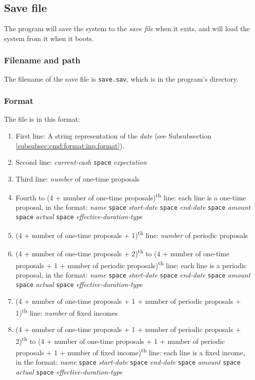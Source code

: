 \subsection{Save file}
The program will save the system to the \emph{save file} when it exits, and will load the system from it when it boots.

\subsubsection{Filename and path}
The filename of the save file is \texttt{save.sav}, which is in the program's directory.

\subsubsection{Format}
The file is in this format:
\begin{enumerate}
	\item First line: A string representation of the \emph{date} (see Subsubsection \ref{subsubsec:cmd:format:inp.format}).
	\item Second line: \emph{current-cash} \texttt{space} \emph{expectation}
	\item Third line: \emph{number} of one-time proposals
	\item Fourth to (4 + number of one-time proposals)\textsuperscript{th} line: each line is a one-time proposal, in the format: \emph{name} \texttt{space} \emph{start-date} \texttt{space} \emph{end-date} \texttt{space} \emph{amount} \texttt{space} \emph{actual} \texttt{space} \emph{effective-duration-type} 
	\item (4 + number of one-time proposals + 1)\textsuperscript{th} line: \emph{number} of periodic proposals
	\item (4 + number of one-time proposals + 2)\textsuperscript{th} to (4 + number of one-time proposals + 1 + number of periodic proposals)\textsuperscript{th} line: each line is a periodic proposal, in the format: \emph{name} \texttt{space} \emph{start-date} \texttt{space} \emph{end-date} \texttt{space} \emph{amount} \texttt{space} \emph{actual} \texttt{space} \emph{effective-duration-type} 
	\item (4 + number of one-time proposals + 1 + number of periodic proposals + 1)\textsuperscript{th} line: \emph{number} of fixed incomes
	\item (4 + number of one-time proposals + 1 + number of periodic proposals + 2)\textsuperscript{th} to (4 + number of one-time proposals + 1 + number of periodic proposals + 1 + number of fixed income)\textsuperscript{th} line: each line is a fixed income, in the format: \emph{name} \texttt{space} \emph{start-date} \texttt{space} \emph{end-date} \texttt{space} \emph{amount} \texttt{space} \emph{actual} \texttt{space} \emph{effective-duration-type} 
\end{enumerate}

